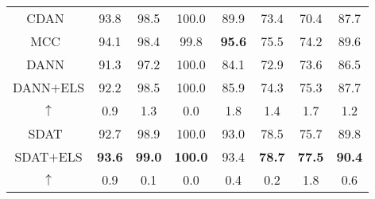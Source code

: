\documentclass{article} \usepackage{iclr2023_conference,times}
\newcommand{\Gray}[0]{\rowcolor{gray!20}}
\begin{document}
\begin{table}[]
\begin{tabular}{@{}c|ccccccc@{}}
CDAN~\citep{long2018conditional}        & 93.8           & 98.5           & 100.0          & 89.9           & 73.4           & 70.4           & 87.7         \\
MCC~\citep{MCC}         & 94.1           & 98.4           & 99.8           & \textbf{95.6}           & 75.5           & 74.2           & 89.6         \\
DANN~\citep{ganin2016domain}  & 91.3 & 97.2 & 100.0 & 84.1 & 72.9 & 73.6 & 86.5 \\\Gray
DANN$+$ELS & 92.2 & 98.5 & 100.0 & 85.9 & 74.3 & 75.3 & 87.7 \\\Gray
$\uparrow$ & 0.9 & 1.3 & 0.0 & 1.8 & 1.4 & 1.7 & 1.2 \\
SDAT~\citep{rangwani2022closer}        & 92.7           & 98.9           & 100.0          & 93.0           & 78.5           & 75.7           & 89.8         \\\Gray
SDAT$+$ELS  &\textbf{93.6}        & \textbf{99.0} & \textbf{100.0} & {93.4} & \textbf{78.7} & \textbf{77.5} & \textbf{90.4}               \\\Gray
$\uparrow$ & 0.9          & 0.1         & 0.0 & 0.4 & 0.2 & 1.8 & 0.6              \\
\bottomrule
\end{tabular}\end{table}
\end{document}
